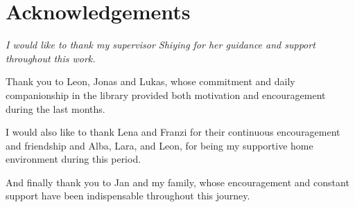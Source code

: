 \chapter*{Acknowledgements}

\begin{center}
  \begin{minipage}{0.85\linewidth}
    \itshape
    I would like to thank my supervisor Shiying for her guidance and support throughout this work.

    Thank you to Leon, Jonas and Lukas, whose commitment and daily companionship in the library provided both motivation and encouragement during the last months.

   I would also like to thank Lena and Franzi for their continuous encouragement and friendship and Alba, Lara, and Leon, for being my supportive home environment during this period.

    And finally thank you to Jan and my family, whose encouragement and constant support have been indispensable throughout this journey.
  \end{minipage}
\end{center}
